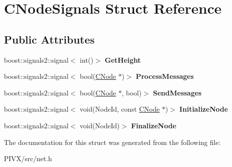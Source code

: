 \hypertarget{struct_c_node_signals}{}\section{C\+Node\+Signals Struct Reference}
\label{struct_c_node_signals}
\subsection*{Public Attributes}
\begin{DoxyCompactItemize}
\item 
\mbox{\label{struct_c_node_signals_ae84a1d4c612bce8f90c8008814afb14e}} 
boost\+::signals2\+::signal$<$ int()$>$ {\bfseries Get\+Height}
\item 
\mbox{\label{struct_c_node_signals_a18d1206d9966a7288c05f83484e1a7a9}} 
boost\+::signals2\+::signal$<$ bool(\mbox{\hyperlink{class_c_node}{C\+Node}} $\ast$)$>$ {\bfseries Process\+Messages}
\item 
\mbox{\label{struct_c_node_signals_a526a182786f3addec6836320dbfbcd9f}} 
boost\+::signals2\+::signal$<$ bool(\mbox{\hyperlink{class_c_node}{C\+Node}} $\ast$, bool)$>$ {\bfseries Send\+Messages}
\item 
\mbox{\label{struct_c_node_signals_a907f7fb3803fd63daca5209c4d7b6a2f}} 
boost\+::signals2\+::signal$<$ void(Node\+Id, const \mbox{\hyperlink{class_c_node}{C\+Node}} $\ast$)$>$ {\bfseries Initialize\+Node}
\item 
\mbox{\label{struct_c_node_signals_af6a795395999180eb97a57e89456059e}} 
boost\+::signals2\+::signal$<$ void(Node\+Id)$>$ {\bfseries Finalize\+Node}
\end{DoxyCompactItemize}


The documentation for this struct was generated from the following file\+:\begin{DoxyCompactItemize}
\item 
P\+I\+V\+X/src/net.\+h\end{DoxyCompactItemize}
